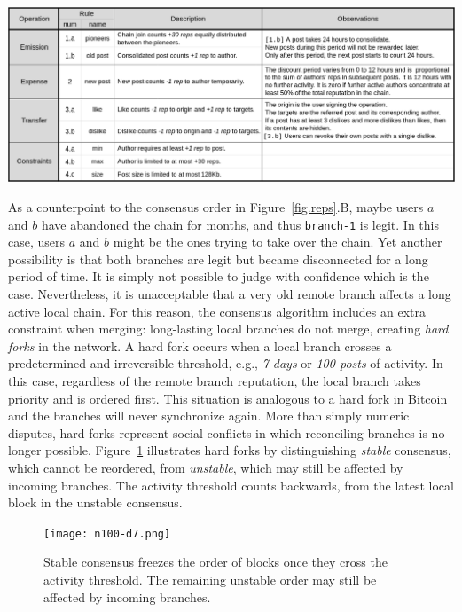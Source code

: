 \documentclass[10pt,journal,compsoc]{IEEEtran}
\newcommand{\FC}       {Freechains\xspace}
\newcommand{\code}[1]  {\texttt{\footnotesize{#1}}}
\begin{document}
\begin{table}
\centering
\includegraphics[width=\textwidth]{rules.png}
\caption{
    Reputation rules for public forum chains in \FC.
    The chosen constants ($30~reps$, $24h$, etc) are arbitrary and target
    typical Internet forums with moderate traffic.
    A future revision of the protocol could support them as chain parameters.
}
\label{fig.rules}
\end{table}

As a counterpoint to the consensus order in Figure~\ref{fig.reps}.B, maybe
users $a$ and $b$ have abandoned the chain for months, and thus \code{branch-1}
is legit.
In this case, users $a$ and $b$ might be the ones trying to take over the
chain.
Yet another possibility is that both branches are legit but became disconnected
for a long period of time.
It is simply not possible to judge with confidence which is the case.
Nevertheless, it is unacceptable that a very old remote branch affects a long
active local chain.
%
For this reason, the consensus algorithm includes an extra constraint when
merging: long-lasting local branches do not merge, creating \emph{hard forks}
in the network.
A hard fork occurs when a local branch crosses a predetermined and irreversible
threshold, e.g., \emph{7 days} or \emph{100 posts} of activity.
In this case, regardless of the remote branch reputation, the local branch
takes priority and is ordered first.
This situation is analogous to a hard fork in Bitcoin and the branches will
never synchronize again.
More than simply numeric disputes, hard forks represent social conflicts in
which reconciling branches is no longer possible.
%
Figure~\ref{fig.hard} illustrates hard forks by distinguishing \emph{stable}
consensus, which cannot be reordered, from \emph{unstable}, which may still be
affected by incoming branches.
The activity threshold counts backwards, from the latest local block in the
unstable consensus.

\begin{figure}
\centering
\texttt{[image: n100-d7.png]}
\caption{
    Stable consensus freezes the order of blocks once they cross the activity
    threshold.
    The remaining unstable order may still be affected by incoming branches.
}
\label{fig.hard}
\end{figure}
\end{document}
